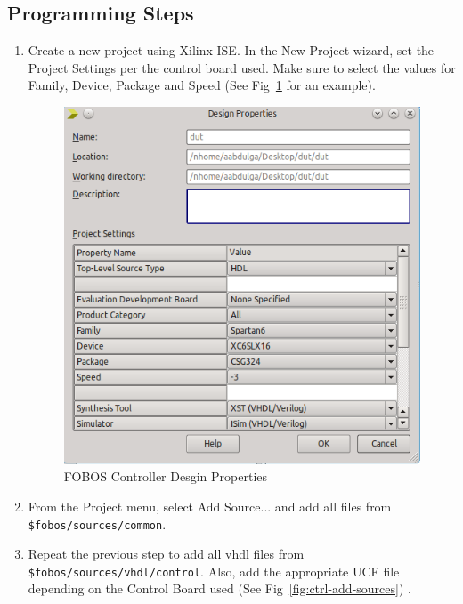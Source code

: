 \subsection {Programming Steps}
\begin{enumerate}
  \item Create a new project using Xilinx ISE. In the New Project wizard, set the Project Settings per the control board used. 
  Make sure to select the values for Family, Device, Package and Speed (See Fig~\ref{fig:ctrl-design-properties} for an example).
  		\begin{figure} 
		\begin{center}
		\includegraphics[scale=0.6]{figures/ctrl-design-properties}
		\caption{\label{fig:ctrl-design-properties}FOBOS Controller Desgin Properties}
		\end{center}
		\vspace{-1ex}
		\end{figure}
  \item From the Project menu, select Add Source... and add all files from \texttt{\$fobos/sources/common}.
  \item Repeat the previous step to add all vhdl files from \texttt{\$fobos/sources/vhdl/control}. Also, add the appropriate UCF file depending on the Control Board used (See Fig~\ref{fig:ctrl-add-sources}) .
		\begin{figure} 

\end{figure}
\end{enumerate}
